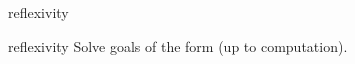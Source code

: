 \begin{tactic}{reflexivity}
  \begin{tsyntax}[empty]{reflexivity}
  Solve goals of the form  (up to computation).
  \end{tsyntax}
\end{tactic}
